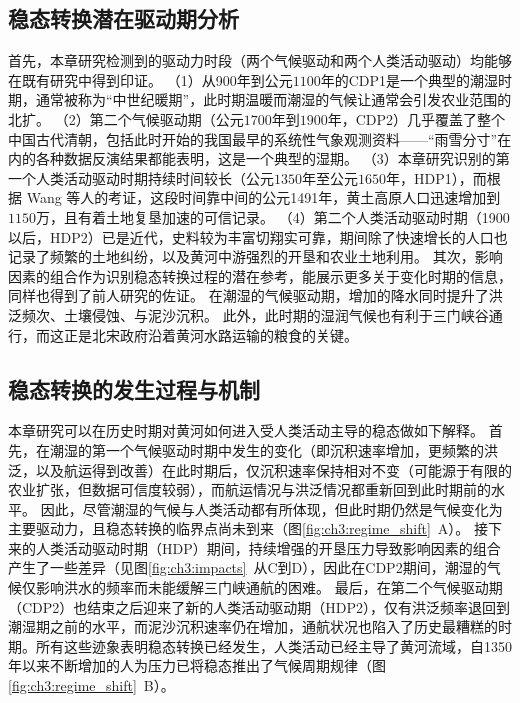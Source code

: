 \subsection{稳态转换潜在驱动期分析}

首先，本章研究检测到的驱动力时段（两个气候驱动和两个人类活动驱动）均能够在既有研究中得到印证。
（1）从900年到公元$1100$年的CDP1是一个典型的潮湿时期，通常被称为“中世纪暖期”\cite{zhang1993, zhang1994, man2014}，此时期温暖而潮湿的气候让通常会引发农业范围的北扩\cite{TanQiXiang1996,GeQuanSheng2011}。
（2）第二个气候驱动期（公元$1700$年到$1900$年，CDP2）几乎覆盖了整个中国古代清朝，包括此时开始的我国最早的系统性气象观测资料——“雨雪分寸”在内的各种数据反演结果都能表明，这是一个典型的湿期\cite{hao2021, ge2008}。
（3）本章研究识别的第一个人类活动驱动时期持续时间较长（公元$1350$年至公元$1650$年，HDP1），而根据 Wang 等人的考证，这段时间靠中间的公元1491年，黄土高原人口迅速增加到$1150$万，且有着土地复垦加速的可信记录\cite{wang2006a}。
（4）第二个人类活动驱动时期（1900以后，HDP2）已是近代，史料较为丰富切翔实可靠，期间除了快速增长的人口也记录了频繁的土地纠纷，以及黄河中游强烈的开垦和农业土地利用\cite{GeJianXiong2005}。
其次，影响因素的组合作为识别稳态转换过程的潜在参考，能展示更多关于变化时期的信息，同样也得到了前人研究的佐证。
在潮湿的气候驱动期，增加的降水同时提升了洪泛频次、土壤侵蚀、与泥沙沉积\cite{chen2012}。
此外，此时期的湿润气候也有利于三门峡谷通行，而这正是北宋政府沿着黄河水路运输的粮食的关键\cite{WangShouChun1993}。

\subsection{稳态转换的发生过程与机制}

本章研究可以在历史时期对黄河如何进入受人类活动主导的稳态做如下解释。
首先，在潮湿的第一个气候驱动时期中发生的变化（即沉积速率增加，更频繁的洪泛，以及航运得到改善）在此时期后，仅沉积速率保持相对不变（可能源于有限的农业扩张，但数据可信度较弱），而航运情况与洪泛情况都重新回到此时期前的水平。
因此，尽管潮湿的气候与人类活动都有所体现，但此时期仍然是气候变化为主要驱动力，且稳态转换的临界点尚未到来（图\ref{fig:ch3:regime_shift}~A）。
接下来的人类活动驱动时期（HDP）期间，持续增强的开垦压力导致影响因素的组合产生了一些差异（见图\ref{fig:ch3:impacts}~从C到D），因此在CDP2期间，潮湿的气候仅影响洪水的频率而未能缓解三门峡通航的困难。
最后，在第二个气候驱动期（CDP2）也结束之后迎来了新的人类活动驱动期（HDP2），仅有洪泛频率退回到潮湿期之前的水平，而泥沙沉积速率仍在增加，通航状况也陷入了历史最糟糕的时期。所有这些迹象表明稳态转换已经发生，人类活动已经主导了黄河流域，自1350年以来不断增加的人为压力已将稳态推出了气候周期规律（图\ref{fig:ch3:regime_shift}~B）。

